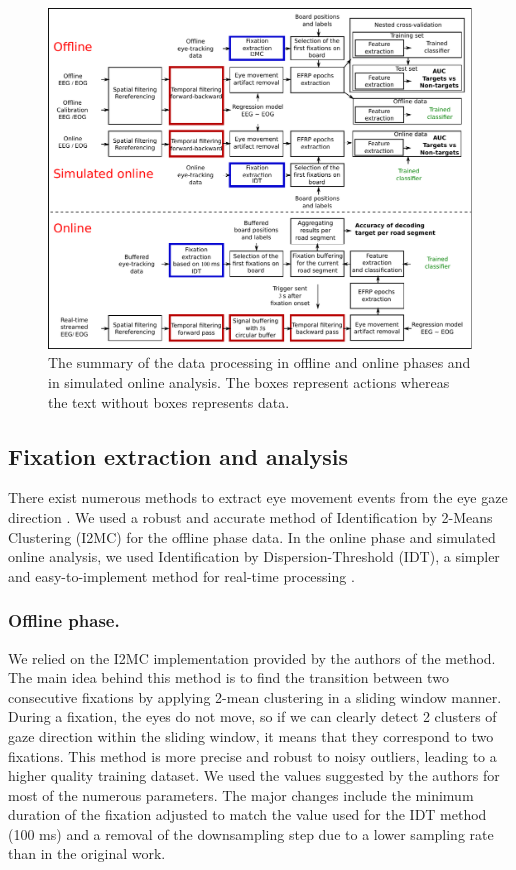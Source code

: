 \documentclass[12pt]{iopart}
\begin{document}
\begin{figure}[!t]
    \centering
    \includegraphics[trim={0cm 0cm 0cm 0cm},clip,width=\textwidth]{../images/DataProcessing3.pdf}
    \caption{The summary of the data processing in offline and online phases and in simulated online
    analysis. The boxes represent actions whereas the text without boxes represents data.}
\label{fig:flowchart}
\end{figure}



\subsection{Fixation extraction and analysis}
There exist numerous methods to extract eye movement events
from the eye gaze direction \cite{zhang_novel_2015,pena_detecting_2019}.
We used a robust and accurate method of 
Identification by 2-Means Clustering (I2MC)
\cite{hessels_noise-robust_2017}
for the offline phase data.
In the online phase and simulated online analysis,
we used Identification by Dispersion-Threshold (IDT), a simpler and
easy-to-implement method for real-time processing \cite{salvucci_identifying_2000}.


\subsubsection*{Offline phase.}
We relied on the I2MC implementation provided by the authors of the method.
The main idea behind this method is to find the transition between two consecutive fixations
by applying 2-mean clustering in a sliding window manner.
During a fixation, the eyes do not move, so if we can clearly detect
2 clusters of gaze direction within the sliding window,
it means that they correspond to two fixations.
This method is more precise and robust to noisy outliers, leading
to a higher quality training dataset.
We used the values suggested by the authors for most of the numerous parameters.
The major changes include the minimum duration of the fixation adjusted
to match the value used for the IDT method (100 ms) and a removal of the downsampling
step due to a lower sampling rate than in the original work.
\end{document}
